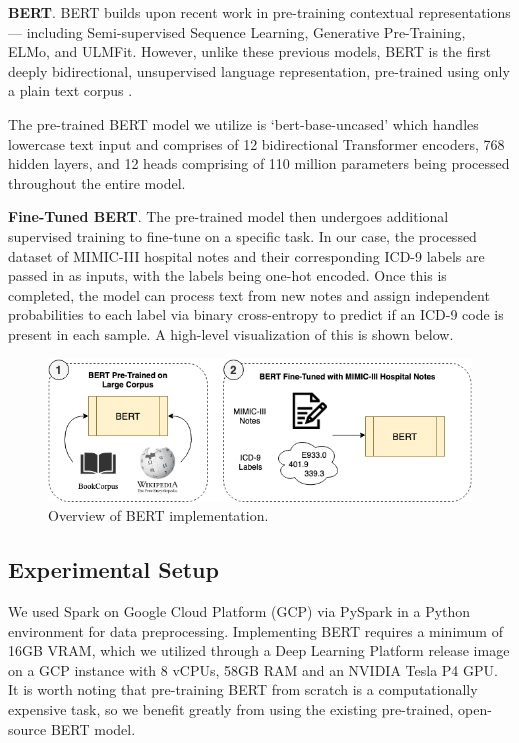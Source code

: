 \documentclass[fleqn,10pt]{olplainarticle}
\begin{document}
\textbf{BERT}. BERT builds upon recent work in pre-training contextual representations — including Semi-supervised Sequence Learning, Generative Pre-Training, ELMo, and ULMFit. However, unlike these previous models, BERT is the first deeply bidirectional, unsupervised language representation, pre-trained using only a plain text corpus \cite{bertPaper}.

The pre-trained BERT model we utilize is ‘bert-base-uncased’ which handles lowercase text input and comprises of 12 bidirectional Transformer encoders, 768 hidden layers, and 12 heads comprising of 110 million parameters being processed throughout the entire model. 

\textbf{Fine-Tuned BERT}. The pre-trained model then undergoes additional supervised training to fine-tune on a specific task. In our case, the processed dataset of MIMIC-III hospital notes and their corresponding ICD-9 labels are passed in as inputs, with the labels being one-hot encoded. Once this is completed, the model can process text from new notes and assign independent probabilities to each label via binary cross-entropy to predict if an ICD-9 code is present in each sample. A high-level visualization of this is shown below.

\begin{figure}[H]
\centering
\includegraphics[width=0.8\linewidth]{bert_implementation_overview.jpeg}
\caption{ Overview of BERT implementation.}
\label{fig:view}
\end{figure}


\subsection{Experimental Setup}
We used Spark on Google Cloud Platform (GCP) via PySpark in a Python environment for data preprocessing. Implementing BERT requires a minimum of 16GB VRAM, which we utilized through a Deep Learning Platform release image on a GCP instance with 8 vCPUs, 58GB RAM and an NVIDIA Tesla P4 GPU. It is worth noting that pre-training BERT from scratch is a computationally expensive task, so we benefit greatly from using the existing pre-trained, open-source BERT model. 
\end{document}
